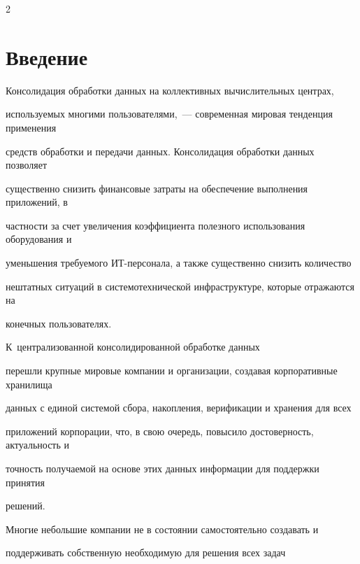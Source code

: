       \begin{multicols}{2}





            \label{st\stat}








\section{Введение}


       


       Консолидация обработки данных на коллективных вычислительных центрах, 


используемых многими пользователями,~--- современная мировая тенденция применения 


средств обработки и передачи данных. Консолидация обработки данных позволяет 


существенно снизить финансовые затраты на обеспечение выполнения приложений, в 


част\-ности за счет увеличения коэффициента полезного использования оборудования и 


уменьшения тре\-бу\-емо\-го ИТ-пер\-со\-на\-ла, а также существенно снизить количество 


нештатных ситуаций в сис\-те\-мо\-тех\-ни\-че\-ской инфраструктуре, которые отражаются на 


конечных пользователях. 





К~централизованной консолидированной обработке данных 


перешли крупные мировые компании и организации, создавая корпоративные хранилища 


данных с единой сис\-те\-мой сбора, накопления, верификации и хранения для всех 


приложений корпорации, что, в свою очередь, повысило достоверность, актуальность и 


точность получаемой на основе этих данных информации для поддержки принятия 


решений. 


       


       Многие небольшие компании не в состоянии самостоятельно создавать и 


поддерживать собственную необходимую для решения всех задач 



\end{multicols}
